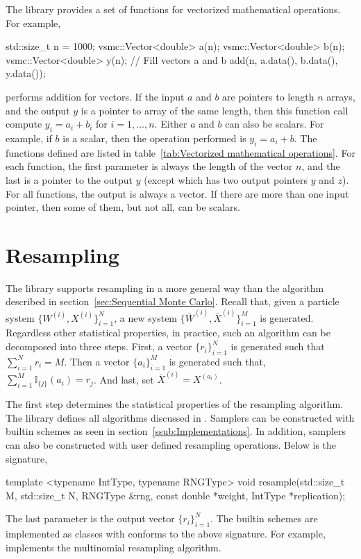 \documentclass[11pt,bib,mint,hyper,altcolor]{marticle}
\begin{document}
The library provides a set of functions for vectorized mathematical operations.
For example,
\begin{cppcode}
  std::size_t n = 1000;
  vsmc::Vector<double> a(n);
  vsmc::Vector<double> b(n);
  vsmc::Vector<double> y(n);
  // Fill vectors a and b
  add(n, a.data(), b.data(), y.data());
\end{cppcode}
performs addition for vectors. If the input $a$ and $b$ are pointers to length
$n$ arrays, and the output $y$ is a pointer to array of the same length, then
this function call compute $y_i = a_i + b_i$ for $i=1,\dots,n$. Either $a$ and
$b$ can also be scalars. For example, if $b$ is a scalar, then the operation
performed is $y_i = a_i + b$. The functions defined are listed in
table~\ref{tab:Vectorized mathematical operations}. For each function, the
first parameter is always the length of the vector $n$, and the last is a
pointer to the output $y$ (except  which has two output
pointers $y$ and $z$). For all functions, the output is always a vector. If
there are more than one input pointer, then some of them, but not all, can be
scalars.

\section{Resampling}
\label{sec:Resampling}

The library supports resampling in a more general way than the algorithm
described in section~\ref{sec:Sequential Monte Carlo}. Recall that, given a
particle system $\{W^{(i)},X^{(i)}\}_{i=1}^N$, a new system $\{\bar{W}^{(i)},
\bar{X}^{(i)}\}_{i=1}^M$ is generated. Regardless other statistical properties,
in practice, such an algorithm can be decomposed into three steps. First, a
vector $\{r_i\}_{i=1}^N$ is generated such that $\sum_{i=1}^N r_i = M$. Then a
vector $\{a_i\}_{i=1}^M$ is generated such that, $\sum_{i=1}^M
\mathbb{I}_{\{j\}}(a_i) = r_j$. And last, set $\bar{X}^{(i)} = X^{(a_i)}$.

The first step determines the statistical properties of the resampling
algorithm. The library defines all algorithms discussed in
\textcite{Douc:2005wa}. Samplers can be constructed with builtin schemes as
seen in section~\ref{ssub:Implementations}. In addition, samplers can also be
constructed with user defined resampling operations. Below is the signature,
\begin{cppcode}
  template <typename IntType, typename RNGType>
  void resample(std::size_t M, std::size_t N, RNGType &rng,
      const double *weight, IntType *replication);
\end{cppcode}
The last parameter is the output vector $\{r_i\}_{i=1}^N$. The builtin schemes
are implemented as classes with  conforms to the above
signature. For example,  implements the
multinomial resampling algorithm.
\end{document}
